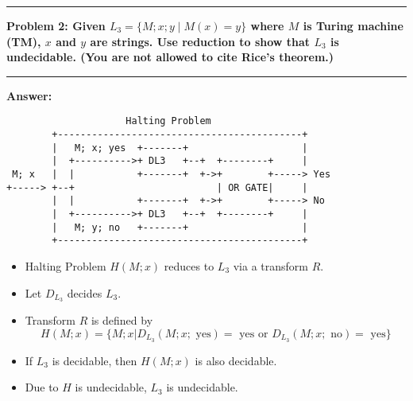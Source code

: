 \documentclass[11pt]{article}
\newcommand\question[2]{\vspace{.25in}\hrule\textbf{#1: #2}\vspace{.5em}\hrule\vspace{.10in}}
\renewcommand\part[1]{\vspace{.10in}\textbf{#1}}
\newcommand\correctness{\vspace{.10in}\textbf{Correctness: }}
\newcommand\runtime{\vspace{.10in}\textbf{Running time: }}
\begin{document}



\question{Problem 2}{Given $L_3 = \{ M ; x ; y \; | \; M(x) = y \}$ where $M$ is Turing machine (TM), $x$ and $y$ are strings. Use reduction to show that $L_3$ is undecidable. (You are not allowed to cite Rice's theorem.)}

\part{Answer:}

\begin{lstlisting}
                     Halting Problem
        +-------------------------------------------+
        |   M; x; yes  +-------+                    |
        |  +---------->+ DL3   +--+  +--------+     |
 M; x   |  |           +-------+  +->+        +-----> Yes
+-----> +--+                         | OR GATE|     |
        |  |           +-------+  +->+        +-----> No
        |  +---------->+ DL3   +--+  +--------+     |
        |   M; y; no   +-------+                    |
        +-------------------------------------------+

\end{lstlisting}

\begin{itemize}
	\item Halting Problem $H(M; x)$ reduces to $L_3$ via a transform $R$.
	\item Let $D_{L_3}$ decides $L_3$.
	\item Transform $R$ is defined by
	$$H(M; x) = \{ M; x | D_{L_3}(M; x; \text{ yes}) = \text{ yes} \text{ or } D_{L_3}(M; x; \text{ no}) = \text{ yes}\}$$
	\item If $L_3$ is decidable, then $H(M; x)$ is also decidable. 
	\item Due to $H$ is undecidable, $L_3$ is undecidable.
\end{itemize}
\end{document}
